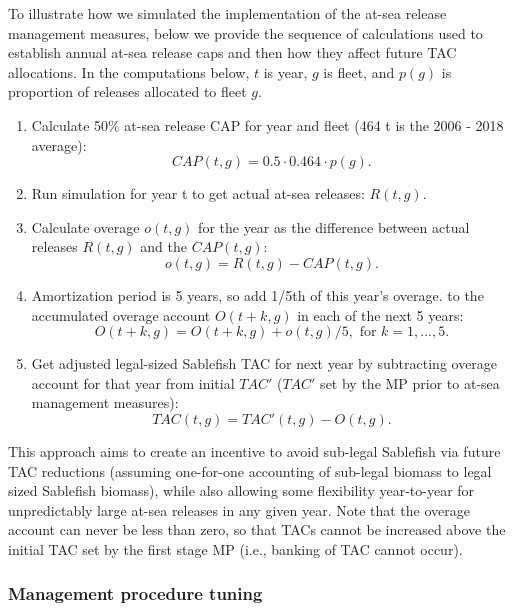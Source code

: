 \documentclass[11pt]{book}
\begin{document}
To illustrate how we simulated the implementation of the at-sea release management measures, below we provide the sequence of calculations used to establish annual at-sea release caps and then how they affect future TAC allocations. In the computations below, \(t\) is year, \(g\) is fleet, and \(p(g)\) is proportion of releases allocated to fleet \(g\).
\begin{enumerate}
\def\labelenumi{\arabic{enumi}.}

\item
  Calculate 50\% at-sea release CAP for year and fleet (464 t is the 2006 - 2018 average): \begin{equation*}
        CAP(t,g) = 0.5 \cdot 0.464 \cdot p(g).
  \end{equation*}
\item
  Run simulation for year t to get actual at-sea releases: \(R(t,g)\).
\item
  Calculate overage \(o(t,g)\) for the year as the difference between actual releases \(R(t,g)\) and the \(CAP(t,g)\): \tabularnewline \begin{equation*}
        o(t,g) = R(t,g) - CAP(t,g).
  \end{equation*}
\item
  Amortization period is 5 years, so add 1/5th of this year's overage. to the accumulated overage account \(O(t+k,g)\) in each of the next 5 years: \begin{equation*}
        O(t + k,g) = O(t+k,g) + o(t,g)/5, \mbox{ for } k = 1, ..., 5.
  \end{equation*}
\item
  Get adjusted legal-sized Sablefish TAC for next year by subtracting overage account for that year from initial \(TAC'\) (\(TAC'\) set by the MP prior to at-sea management measures): \begin{equation*}
        TAC(t,g) = TAC'(t,g) - O(t,g).
  \end{equation*}
\end{enumerate}
This approach aims to create an incentive to avoid sub-legal Sablefish via future TAC reductions (assuming one-for-one accounting of sub-legal biomass to legal sized Sablefish biomass), while also allowing some flexibility year-to-year for unpredictably large at-sea releases in any given year. Note that the overage account can never be less than zero, so that TACs cannot be increased above the initial TAC set by the first stage MP (i.e., banking of TAC cannot occur).

\hypertarget{management-procedure-tuning}{%
\subsubsection{Management procedure tuning}\label{management-procedure-tuning}}
\end{document}
